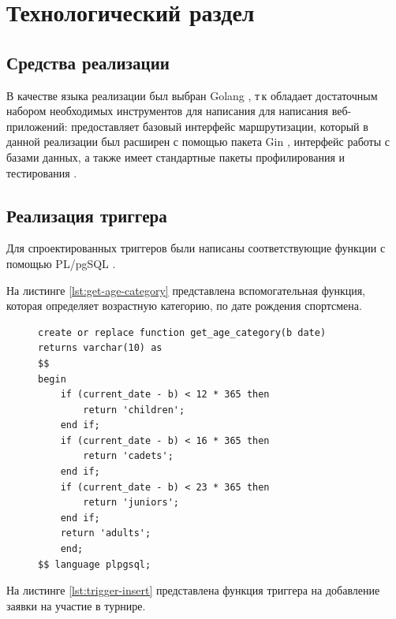 \chapter{Технологический раздел}\label{sec:impl}

\section{Средства реализации}

В качестве языка реализации был выбран Golang \cite{GO}, т\,к обладает достаточным набором необходимых инструментов для написания для написания веб-приложений: предоставляет базовый интерфейс маршрутизации, который в данной реализации был расширен с помощью пакета Gin \cite{GIN}, интерфейс работы с базами данных, а также имеет стандартные пакеты профилирования и тестирования \cite{testing}.


\section{Реализация триггера}

Для спроектированных триггеров были написаны соответствующие функции с помощью PL/pgSQL \cite{PL}.

На листинге \ref{lst:get-age-category} представлена вспомогательная функция, которая определяет возрастную категорию, по дате рождения спортсмена.

\begin{figure}[H]
	\begin{lstlisting}[label=lst:get-age-category,caption=Реализация вспомогательной функции get\_age\_category() ]
create or replace function get_age_category(b date) 
returns varchar(10) as 
$$
begin 
	if (current_date - b) < 12 * 365 then 
		return 'children';
	end if;
	if (current_date - b) < 16 * 365 then
		return 'cadets';
	end if;
	if (current_date - b) < 23 * 365 then
		return 'juniors';
	end if;
	return 'adults';
	end;
$$ language plpgsql;
	\end{lstlisting}
\end{figure}

На листинге \ref{lst:trigger-insert} представлена функция триггера на добавление заявки на участие в турнире.

